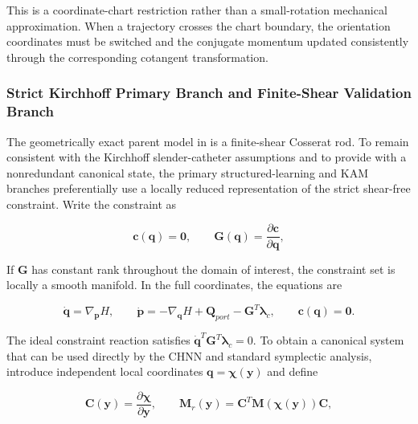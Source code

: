 This is a coordinate-chart restriction rather than a small-rotation mechanical approximation. When a trajectory crosses the chart boundary, the orientation coordinates must be switched and the conjugate momentum updated consistently through the corresponding cotangent transformation.

\subsubsection{Strict Kirchhoff Primary Branch and Finite-Shear Validation Branch}\label{sec:hamiltonian-3-6-2}

The geometrically exact parent model in  is a finite-shear Cosserat rod. To remain consistent with the Kirchhoff slender-catheter assumptions and to provide  with a nonredundant canonical state, the primary structured-learning and KAM branches preferentially use a locally reduced representation of the strict shear-free constraint. Write the constraint as\cite{MarsdenRatiu1999MechanicsSymmetry,HairerLubichWanner2006GNI}

\begin{equation}
\label{eq:hamiltonian-3-62}
\mathbf{c}\left( \mathbf{q} \right) = \mathbf{0},\quad\quad\mathbf{G}\left( \mathbf{q} \right) = \frac{\partial\mathbf{c}}{\partial\mathbf{q}},
\end{equation}

If \(\mathbf{G}\) has constant rank throughout the domain of interest, the constraint set is locally a smooth manifold. In the full coordinates, the equations are

\begin{equation}
\label{eq:hamiltonian-3-63}
\boxed{\dot{\mathbf{q}} = \nabla_{\mathbf{p}}H,\quad\quad\dot{\mathbf{p}} = - \nabla_{\mathbf{q}}H + \mathbf{Q}_{port} - \mathbf{G}^{T}\bm{\lambda}_{c},\quad\quad\mathbf{c}\left( \mathbf{q} \right) = \mathbf{0}.}
\end{equation}

The ideal constraint reaction satisfies \({\dot{\mathbf{q}}}^{T}\mathbf{G}^{T}\bm{\lambda}_{c}=0\). To obtain a canonical system that can be used directly by the CHNN and standard symplectic analysis, introduce independent local coordinates \(\mathbf{q} = \bm{\chi}\left( \mathbf{y} \right)\) and define

\begin{equation}
\label{eq:hamiltonian-3-64}
\mathbf{C}\left( \mathbf{y} \right) = \frac{\partial\bm{\chi}}{\partial\mathbf{y}},\quad\quad\mathbf{M}_{r}\left( \mathbf{y} \right) = \mathbf{C}^{T}\mathbf{M}\left( \bm{\chi}\left( \mathbf{y} \right) \right)\mathbf{C},
\end{equation}

